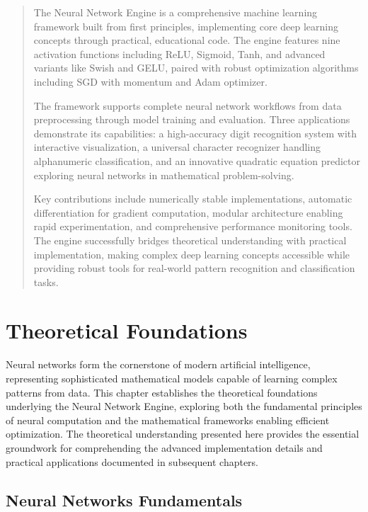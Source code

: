 \documentclass[11pt,a4paper]{report}
\begin{document}
\newpage

\begin{abstract}
The Neural Network Engine is a comprehensive machine learning framework built from first principles, implementing core deep learning concepts through practical, educational code. The engine features nine activation functions including ReLU, Sigmoid, Tanh, and advanced variants like Swish and GELU, paired with robust optimization algorithms including SGD with momentum and Adam optimizer.

The framework supports complete neural network workflows from data preprocessing through model training and evaluation. Three applications demonstrate its capabilities: a high-accuracy digit recognition system with interactive visualization, a universal character recognizer handling alphanumeric classification, and an innovative quadratic equation predictor exploring neural networks in mathematical problem-solving.

Key contributions include numerically stable implementations, automatic differentiation for gradient computation, modular architecture enabling rapid experimentation, and comprehensive performance monitoring tools. The engine successfully bridges theoretical understanding with practical implementation, making complex deep learning concepts accessible while providing robust tools for real-world pattern recognition and classification tasks.
\end{abstract}

\tableofcontents
\newpage

\chapter{Theoretical Foundations}

Neural networks form the cornerstone of modern artificial intelligence, representing sophisticated mathematical models capable of learning complex patterns from data. This chapter establishes the theoretical foundations underlying the Neural Network Engine, exploring both the fundamental principles of neural computation and the mathematical frameworks enabling efficient optimization. The theoretical understanding presented here provides the essential groundwork for comprehending the advanced implementation details and practical applications documented in subsequent chapters.

\section{Neural Networks Fundamentals}
\end{document}
